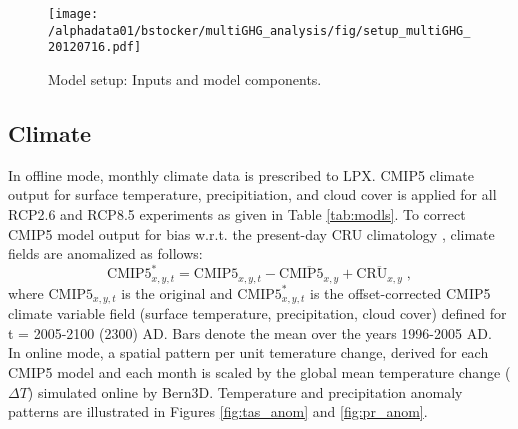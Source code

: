 \begin{figure}[h!]
  \begin{center}
    \noindent\texttt{[image: /alphadata01/bstocker/multiGHG\_analysis/fig/setup\_multiGHG\_20120716.pdf]}
  \end{center}
  \caption[Model setup: Inputs and model components]{Model setup: Inputs and model components.}
  \label{fig:setup}
\end{figure}



\subsection{Climate}
\label{sec:climate}
In offline mode, monthly climate data is prescribed to LPX. CMIP5 climate output for surface temperature, precipitiation, and cloud cover is applied for all RCP2.6 and RCP8.5 experiments as given in Table \ref{tab:modls}. To correct CMIP5 model output for bias w.r.t. the present-day CRU climatology \citep{mitchelljones05clim}, climate fields are anomalized as follows:
\begin{equation}
\mathrm{CMIP5}^\ast_{x,y,t}=\mathrm{CMIP5}_{x,y,t}-\overline{\mathrm{CMIP5}_{x,y}}+\overline{\mathrm{CRU}_{x,y}} \;,
\end{equation}
where $\mathrm{CMIP5}_{x,y,t}$ is the original and $\mathrm{CMIP5}^\ast_{x,y,t}$ is the offset-corrected CMIP5 climate variable field (surface temperature, precipitation, cloud cover) defined for t = 2005-2100 (2300) AD. Bars denote the mean over the years 1996-2005 AD.\\

In online mode, a spatial pattern per unit temerature change, derived for each CMIP5 model and each month is scaled by the global mean temperature change ($\Delta T$) simulated online by Bern3D. Temperature and precipitation anomaly patterns are illustrated in Figures \ref{fig:tas_anom} and \ref{fig:pr_anom}.

